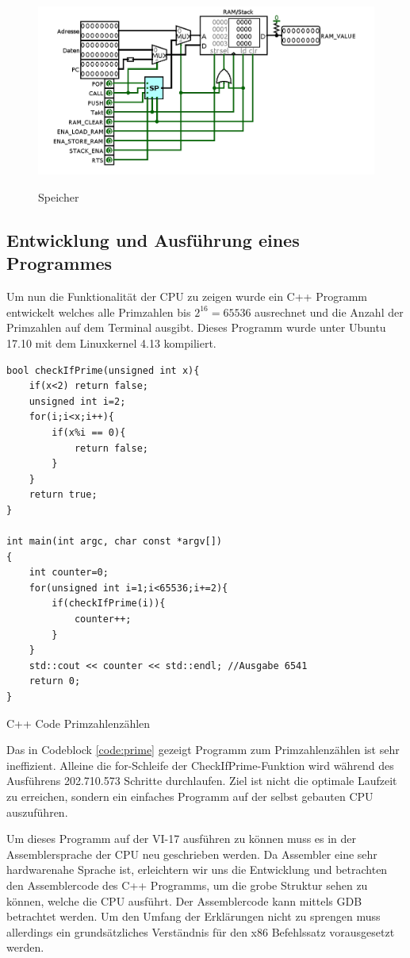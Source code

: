 \documentclass[12pt]{article}
\begin{document}
\newpage

\begin{figure}[!hp]
\includegraphics[scale=0.45]{ram}
\centering
\label{fig:register}
\caption{Speicher}
\end{figure}
\newpage

\subsection{Entwicklung und Ausführung eines Programmes}
Um nun die Funktionalität der CPU zu zeigen wurde ein C++ Programm entwickelt welches alle Primzahlen bis $2^{16} = 65536$ ausrechnet und die Anzahl der Primzahlen auf dem Terminal ausgibt. Dieses Programm wurde unter Ubuntu 17.10 mit dem Linuxkernel 4.13 kompiliert.

\begin{code}[!htb]
\begin{lstlisting}
bool checkIfPrime(unsigned int x){
	if(x<2) return false;
	unsigned int i=2;
	for(i;i<x;i++){
		if(x%i == 0){
			return false;
		}
	}
	return true;
}

int main(int argc, char const *argv[])
{
	int counter=0;
	for(unsigned int i=1;i<65536;i+=2){
		if(checkIfPrime(i)){
			counter++;
		}
	}
	std::cout << counter << std::endl; //Ausgabe 6541
	return 0;
}
\end{lstlisting}
\caption[C++ Code Primzahlenzählen]{C++ Code Primzahlenzählen}
\label{code:prime}
\end{code}

\noindent Das in Codeblock \ref{code:prime} gezeigt Programm zum Primzahlenzählen ist sehr ineffizient. Alleine die for-Schleife der CheckIfPrime-Funktion wird während des Ausführens 202.710.573 Schritte durchlaufen. Ziel ist nicht die optimale Laufzeit zu erreichen, sondern ein einfaches Programm auf der selbst gebauten CPU auszuführen.

\par\bigskip\noindent Um dieses Programm auf der VI-17 ausführen zu können muss es in der Assemblersprache der CPU neu geschrieben werden. Da Assembler eine sehr hardwarenahe Sprache ist, erleichtern wir uns die Entwicklung und betrachten den Assemblercode des C++ Programms, um die grobe Struktur sehen zu können, welche die CPU ausführt. Der Assemblercode kann mittels GDB betrachtet werden. Um den Umfang der Erklärungen nicht zu sprengen muss allerdings ein grundsätzliches Verständnis für den x86 Befehlssatz vorausgesetzt werden.
\newpage
\end{document}
